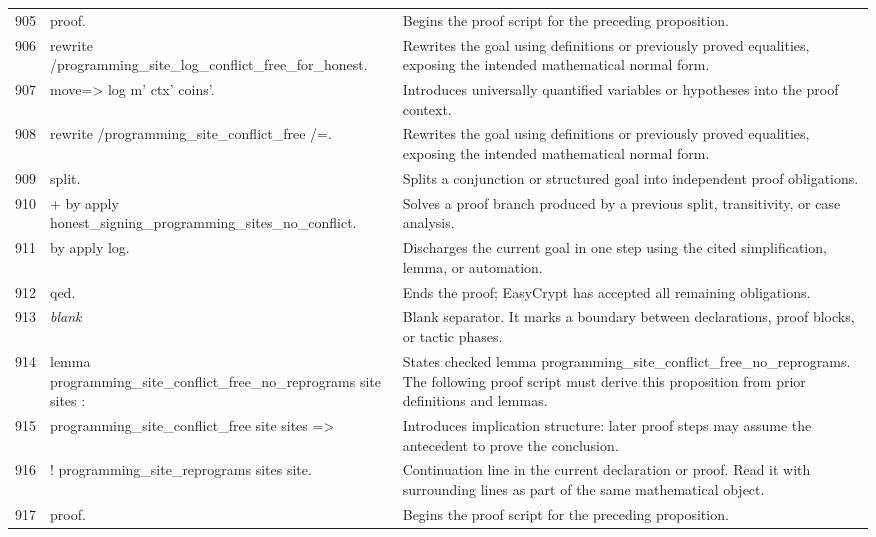 \documentclass[10pt]{article}
\begin{document}
\begin{longtable}{r L{0.53\textwidth} L{0.37\textwidth}}
905 & {\ttfamily\scriptsize proof.} & Begins the proof script for the preceding proposition. \\
906 & {\ttfamily\scriptsize rewrite /programming\_site\_log\_conflict\_free\_for\_honest.} & Rewrites the goal using definitions or previously proved equalities, exposing the intended mathematical normal form. \\
907 & {\ttfamily\scriptsize move=> log m' ctx' coins'.} & Introduces universally quantified variables or hypotheses into the proof context. \\
908 & {\ttfamily\scriptsize rewrite /programming\_site\_conflict\_free /=.} & Rewrites the goal using definitions or previously proved equalities, exposing the intended mathematical normal form. \\
909 & {\ttfamily\scriptsize split.} & Splits a conjunction or structured goal into independent proof obligations. \\
910 & {\ttfamily\scriptsize + by apply honest\_signing\_programming\_sites\_no\_conflict.} & Solves a proof branch produced by a previous split, transitivity, or case analysis. \\
911 & {\ttfamily\scriptsize by apply log.} & Discharges the current goal in one step using the cited simplification, lemma, or automation. \\
912 & {\ttfamily\scriptsize qed.} & Ends the proof; EasyCrypt has accepted all remaining obligations. \\
913 & {\ttfamily\scriptsize \emph{blank}} & Blank separator.  It marks a boundary between declarations, proof blocks, or tactic phases. \\
914 & {\ttfamily\scriptsize lemma programming\_site\_conflict\_free\_no\_reprograms site sites :} & States checked lemma programming\_site\_conflict\_free\_no\_reprograms.  The following proof script must derive this proposition from prior definitions and lemmas. \\
915 & {\ttfamily\scriptsize   programming\_site\_conflict\_free site sites =>} & Introduces implication structure: later proof steps may assume the antecedent to prove the conclusion. \\
916 & {\ttfamily\scriptsize   ! programming\_site\_reprograms sites site.} & Continuation line in the current declaration or proof.  Read it with surrounding lines as part of the same mathematical object. \\
917 & {\ttfamily\scriptsize proof.} & Begins the proof script for the preceding proposition. \\

\end{longtable}
\end{document}
